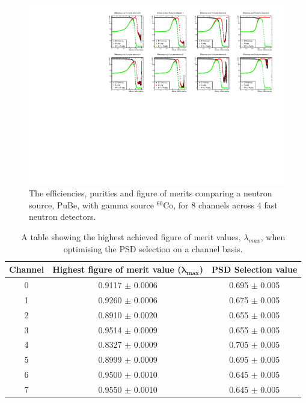 \begin{figure}[htbp]
\begin{center}
\includegraphics[width=160mm]{Chapter8/figures/eff_pur_allChannels_pube_co60_matchedEvents.pdf}
\caption{The efficiencies, purities and figure of merits comparing a neutron source, PuBe, with gamma source $^{60}$Co, for 8 channels across 4 fast neutron detectors. }
\label{fig:modesEffAndPurAllChannels}
\end{center}
\end{figure}


\begin{table}[h]
\centering
	\begin{tabular}{ccc}
	\hline
	\textbf{Channel} & \textbf{Highest figure of merit value} ($\mathbf{\lambda_{max}}$)&  \textbf{PSD Selection value}\\
	\hline
	0  & 0.9117 $\pm$ 0.0006 & 0.695 $\pm$ 0.005 \\ 
	1  & 0.9260 $\pm$ 0.0006 & 0.675 $\pm$ 0.005 \\ 
	2  & 0.8910 $\pm$ 0.0020 & 0.655 $\pm$ 0.005 \\ 
	3  & 0.9514 $\pm$ 0.0009 & 0.655 $\pm$ 0.005 \\ 
	4  & 0.8327 $\pm$ 0.0009 & 0.705 $\pm$ 0.005 \\ 
	5  & 0.8999 $\pm$ 0.0009 & 0.695 $\pm$ 0.005 \\ 
	6  & 0.9500 $\pm$ 0.0010 & 0.645 $\pm$ 0.005 \\ 
	7  & 0.9550 $\pm$ 0.0010 & 0.645 $\pm$ 0.005 \\ 
	\hline
\end{tabular}
\caption{A table showing the highest achieved figure of merit values, $\lambda_{max}$, when optimising the PSD selection on a channel basis. }
\label{tab:modesPSDAllChannelsBestFOMValues}
\end{table}

